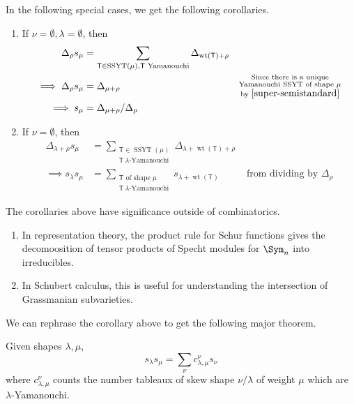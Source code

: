 \documentclass[11pt,leqno,oneside]{amsart}
\numberwithin{thm}{section}
\newcommand{\T}{\mathsf{T}} %
\newcommand{\Vdet}{\Delta}
\newcommand{\rowshift}{\rho}
\newcommand{\SSYT}{\operatorname{SSYT}} %
\newcommand{\wt}{\operatorname{wt}}
\begin{document}
\begin{cor}\label{lr-generalization-corollaries} In the 
  following special cases, we get the following corollaries.
  \begin{enumerate}
  \item If \(\nu = \emptyset, \lambda = \emptyset\), then
    \begin{align*}
      \Vdet_{\rowshift} s_\mu
      & = \sum_{\T \in \SSYT(\mu), \T \text{ Yamanouchi}}
        \Vdet_{\wt(\T)+\rowshift}  \\ 
      \implies \Vdet_{\rowshift} s_\mu
      & = \Vdet_{\mu+\rowshift}
      & \substack{\text{Since there is a unique} \\ \text{Yamanouchi
      SSYT of shape }\mu \\ \text{by }\ref{super-semistandard}} \\
      \implies s_\mu & = \Vdet_{\mu+\rowshift}/\Vdet_{\rowshift}
    \end{align*}
  \item If \(\nu = \emptyset\), then
    \begin{align*}
      \Vdet_{\lambda+\rowshift} s_\mu
      & = \sum_{\substack{\T \in \SSYT(\mu)\\ \T\ 
      \lambda\text{-Yamanouchi}}} 
        \Vdet_{\lambda+\wt(\T)+\rowshift} \\
      \implies s_\lambda s_\mu
      & = \sum_{\substack{\T \text{ of shape }\mu \\ \T \ \lambda\text{-Yamanouchi}}}
      s_{\lambda+\wt(\T)}
      & \text{ from dividing by }\Vdet_\rowshift
    \end{align*}
  \end{enumerate}
\end{cor}
\begin{rmk}
  The corollaries above have significance outside of combinatorics.
  \begin{enumerate}
  \item In representation theory, the product rule for Schur functions
    gives the decomoosition of tensor products of Specht modules for
    \(\Sym_n\) into irreducibles.
  \item In Schubert calculus, this is useful for understanding the
    intersection of Grassmanian subvarieties. \todo{Make this more
      precise.} 
  \end{enumerate}
\end{rmk}
We can rephrase the corollary above to get the following major
theorem.
\begin{thm}
  Given shapes \(\lambda, \mu\), \[
    s_\lambda s_\mu = \sum_{\nu} c_{\lambda, \mu}^\nu s_\nu
  \]
  where \(c_{\lambda, \mu}^\nu\) counts the number tableaux of skew shape
  \(\nu/\lambda\) of weight \(\mu\) which are \(\lambda\)-Yamanouchi.
\end{thm}
\end{document}
